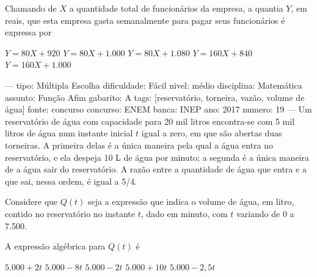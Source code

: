 Chamando de \( X \) a quantidade total de funcionários da empresa, a quantia \( Y \), em reais, que esta empresa gasta semanalmente para pagar seus funcionários é expressa por
\begin{choices}
\choice \( Y = 80X + 920 \)
\choice \( Y = 80X + 1{.}000 \)
\choice \( Y = 80X + 1{.}080 \)
\correctchoice \( Y = 160X + 840 \)
\choice \( Y = 160X + 1{.}000 \)
\end{choices}

---
tipo: Múltipla Escolha
dificuldade: Fácil
nivel: médio
disciplina: Matemática
assunto: Função Afim
gabarito: A
tags: [reservatório, torneira, vazão, volume de água]
fonte: concurso
concurso: ENEM
banca: INEP
ano: 2017
numero: 19
---
\question
Um reservatório de água com capacidade para 20 mil litros encontra-se com 5 mil litros de água num instante inicial \( t \) igual a zero, em que são abertas duas torneiras. A primeira delas é a única maneira pela qual a água entra no reservatório, e ela despeja 10 L de água por minuto; a segunda é a única maneira de a água sair do reservatório. A razão entre a quantidade de água que entra e a que sai, nessa ordem, é igual a 5/4.

Considere que \( Q(t) \) seja a expressão que indica o volume de água, em litro, contido no reservatório no instante \( t \), dado em minuto, com \( t \) variando de 0 a 7.500.

A expressão algébrica para \( Q(t) \) é
\begin{oneparchoices}
\correctchoice \( 5{.}000 + 2t \)
\choice \( 5{.}000 - 8t \)
\choice \( 5{.}000 - 2t \)
\choice \( 5{.}000 + 10t \)
\choice \( 5{.}000 - 2{,}5t \)
\end{oneparchoices}
